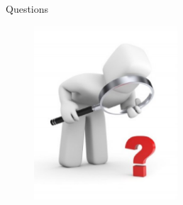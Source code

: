 \documentclass{beamer}
\begin{document}

\begin{frame}{Questions}
    \begin{figure}[!t]
    \centering
    \includegraphics[width=2.1in]{figures/question.eps}
    \label{questionfig}
    \end{figure}
\end{frame}
\end{document}
